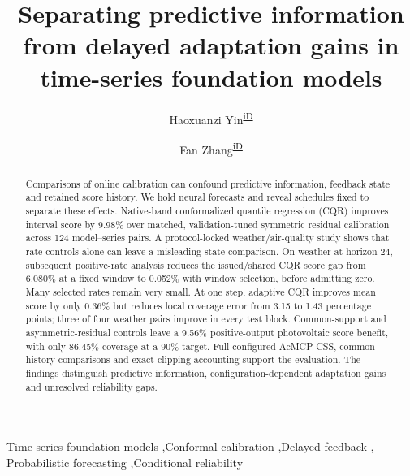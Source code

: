 \documentclass[preprint,11pt]{elsarticle}
\begin{document}
\begin{frontmatter}
\title{Separating predictive information from delayed adaptation gains in time-series foundation models}
\author[a]{Haoxuanzi Yin\textsuperscript{\href{https://orcid.org/0009-0001-1166-2216}{iD}}}
\author[b]{Fan Zhang\textsuperscript{\href{https://orcid.org/0009-0004-3509-7495}{iD}}}
\begin{abstract}
Comparisons of online calibration can confound predictive information, feedback state
and retained score history. We hold neural forecasts and reveal schedules fixed to
separate these effects. Native-band conformalized quantile regression (CQR) improves
interval score by 9.98\% over matched, validation-tuned symmetric residual calibration
across 124 model--series pairs. A protocol-locked weather/air-quality study shows that
rate controls alone can leave a misleading state comparison. On weather at horizon 24,
subsequent positive-rate analysis reduces the issued/shared CQR score gap from 6.080\%
at a fixed window to 0.052\% with window selection, before admitting zero. Many selected
rates remain very small. At one step, adaptive CQR improves mean score by only 0.36\%
but reduces local coverage error from 3.15 to 1.43 percentage points; three of four
weather pairs improve in every test block. Common-support and asymmetric-residual
controls leave a 9.56\% positive-output photovoltaic score benefit, with only 86.45\%
coverage at a 90\% target. Full configured AcMCP-CSS, common-history comparisons and
exact clipping accounting support the evaluation. The findings distinguish predictive
information, configuration-dependent adaptation gains and unresolved reliability gaps.
\end{abstract}
\begin{keyword}
Time-series foundation models \sep Conformal calibration \sep Delayed feedback \sep
Probabilistic forecasting \sep Conditional reliability
\end{keyword}
\end{frontmatter}

\clearpage
\appendix

\clearpage


\end{document}
